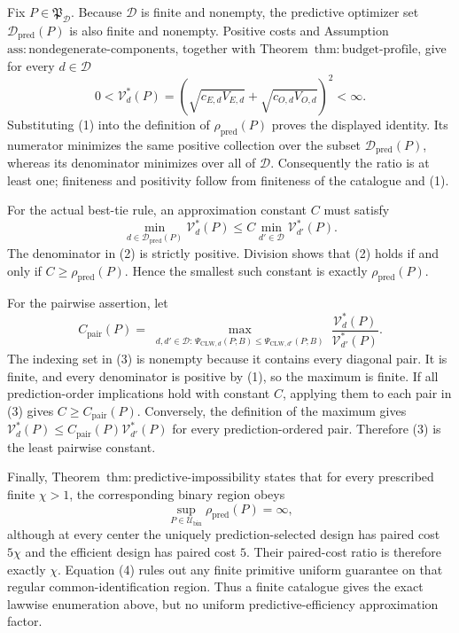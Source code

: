 Fix \(P\in\mathfrak P_{\mathcal D}\).  Because \(\mathcal D\) is finite and nonempty, the predictive optimizer set \(\mathcal D_{\mathrm{pred}}(P)\) is also finite and nonempty.  Positive costs and Assumption~\(\mathrm{ass{:}nondegenerate\text{-}components}\), together with Theorem~\(\mathrm{thm{:}budget\text{-}profile}\), give for every \(d\in\mathcal D\)
\[
 0<\mathcal V_d^*(P)
 =\left(\sqrt{c_{E,d}V_{E,d}}+
         \sqrt{c_{O,d}V_{O,d}}\right)^2<\infty.        \tag{1}
\]
Substituting (1) into the definition of \(\rho_{\mathrm{pred}}(P)\) proves the displayed identity.  Its numerator minimizes the same positive collection over the subset \(\mathcal D_{\mathrm{pred}}(P)\), whereas its denominator minimizes over all of \(\mathcal D\).  Consequently the ratio is at least one; finiteness and positivity follow from finiteness of the catalogue and (1).

For the actual best-tie rule, an approximation constant \(C\) must satisfy
\[
 \min_{d\in\mathcal D_{\mathrm{pred}}(P)}\mathcal V_d^*(P)
 \le C\min_{d'\in\mathcal D}\mathcal V_{d'}^*(P).     \tag{2}
\]
The denominator in (2) is strictly positive.  Division shows that (2) holds if and only if \(C\ge\rho_{\mathrm{pred}}(P)\).  Hence the smallest such constant is exactly \(\rho_{\mathrm{pred}}(P)\).

For the pairwise assertion, let
\[
 C_{\mathrm{pair}}(P)=
 \max_{\substack{d,d'\in\mathcal D:\,
 \Psi_{\mathrm{CLW},d}(P;B)
 \le\Psi_{\mathrm{CLW},d'}(P;B)}}
 \frac{\mathcal V_d^*(P)}{\mathcal V_{d'}^*(P)}.       \tag{3}
\]
The indexing set in (3) is nonempty because it contains every diagonal pair.  It is finite, and every denominator is positive by (1), so the maximum is finite.  If all prediction-order implications hold with constant \(C\), applying them to each pair in (3) gives \(C\ge C_{\mathrm{pair}}(P)\).  Conversely, the definition of the maximum gives
\(\mathcal V_d^*(P)\le C_{\mathrm{pair}}(P)\mathcal V_{d'}^*(P)\) for every prediction-ordered pair.  Therefore (3) is the least pairwise constant.

Finally, Theorem~\(\mathrm{thm{:}predictive\text{-}impossibility}\) states that for every prescribed finite \(\chi>1\), the corresponding binary region obeys
\[
 \sup_{P\in\mathcal U_{\mathrm{bin}}}\rho_{\mathrm{pred}}(P)=\infty,       \tag{4}
\]
although at every center the uniquely prediction-selected design has paired cost \(5\chi\) and the efficient design has paired cost \(5\).  Their paired-cost ratio is therefore exactly \(\chi\).  Equation (4) rules out any finite primitive uniform guarantee on that regular common-identification region.  Thus a finite catalogue gives the exact lawwise enumeration above, but no uniform predictive-efficiency approximation factor.